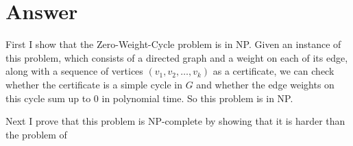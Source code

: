 \documentclass[12pt,letterpaper]{article}
\begin{document}
\section*{Answer}
First I show that the Zero-Weight-Cycle problem is in NP. Given an instance of this problem, which consists of a directed graph and a weight on each of its edge, along with a sequence of vertices $(v_1, v_2, \dots, v_k)$ as a certificate, we can check whether the certificate is a simple cycle in $G$ and whether the edge weights on this cycle sum up to 0 in polynomial time. So this problem is in NP.

Next I prove that this problem is NP-complete by showing that it is harder than the problem of 
 
\end{document}
